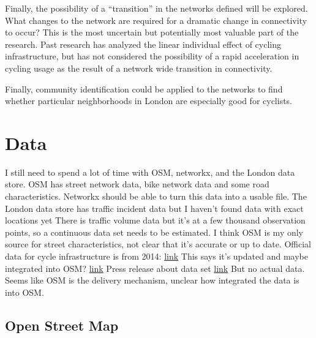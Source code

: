 \documentclass[11pt]{article} %
\begin{document}
Finally, the possibility of a ``transition'' in the networks defined will be explored. What changes to the network are required for a dramatic change in connectivity to occur? This is the most uncertain but potentially most valuable part of the research. Past research has analyzed the linear individual effect of cycling infrastructure, but has not considered the possibility of a rapid acceleration in cycling usage as the result of a network wide transition in connectivity. 

Finally, community identification could be applied to the networks to find whether particular neighborhoods in London are especially good for cyclists. 

\section{Data}

I still need to spend a lot of time with OSM, networkx, and the London data store. 
OSM has street network data, bike network data and some road characteristics. 
Networkx should be able to turn this data into a usable file. 
The London data store has traffic incident data but I haven't found data with exact locations yet
There is traffic volume data but it's at a few thousand observation points, so a continuous data set needs to be estimated. 
I think OSM is my only source for street characteristics, not clear that it's accurate or up to date.
Official data for cycle infrastructure is from 2014: \href{https://data.gov.uk/dataset/47f0a282-3356-4530-8e7b-f67aaf4bec63/cycle-routes}{link}
This says it's updated and maybe integrated into OSM? \href{https://www.cyclestreets.net/blog/category/open-data/}{link}
Press release about data set \href{https://www.london.gov.uk/press-releases/mayoral/action-plan-to-get-more-londoners-cycling}{link}
But no actual data. Seems like OSM is the delivery mechanism, unclear how integrated the data is into OSM. 

\subsection{Open Street Map}
\end{document}

